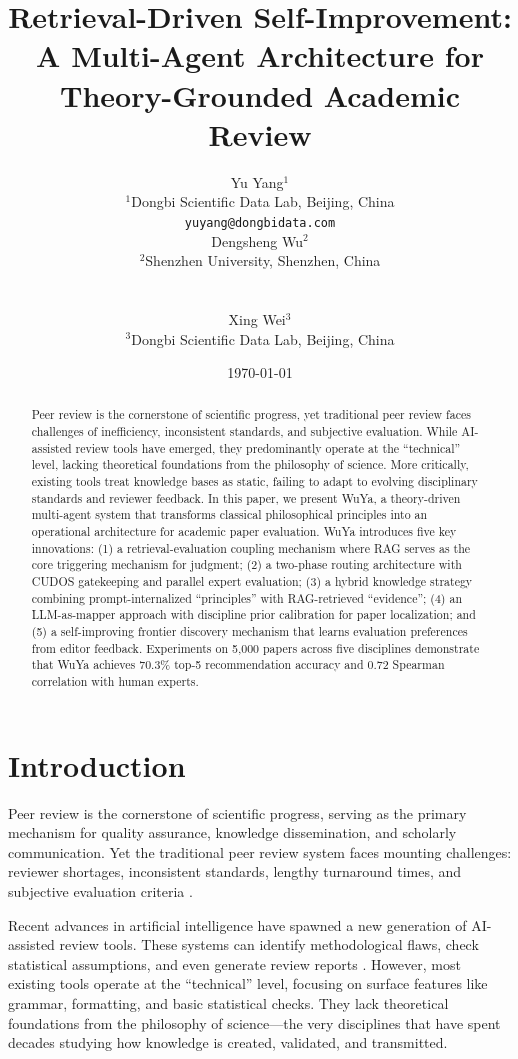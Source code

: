 \documentclass[11pt,a4paper]{article}
\title{Retrieval-Driven Self-Improvement: A Multi-Agent Architecture for Theory-Grounded Academic Review}
\author{
\begin{minipage}[t]{0.45\textwidth}
\centering
Yu Yang$^{1}$\\
\vspace{0.2em} 
\small $^{1}$Dongbi Scientific Data Lab, Beijing, China\\
\vspace{0.1em} 
\small \texttt{yuyang@dongbidata.com}
\end{minipage}
\hfill
\begin{minipage}[t]{0.45\textwidth}
\centering
Dengsheng Wu$^{2}$\\
\vspace{0.2em} 
\small $^{2}$Shenzhen University, Shenzhen, China
\end{minipage}
\\[1em]  
\begin{minipage}[t]{0.45\textwidth}
\centering
Xing Wei$^{3}$\\
\vspace{0.2em} 
\small $^{3}$Dongbi Scientific Data Lab, Beijing, China
\end{minipage}
}
\date{\today}
\newcommand{\rag}{RAG}
\begin{document}
\maketitle

\begin{abstract}
Peer review is the cornerstone of scientific progress, yet traditional peer review faces challenges of inefficiency, inconsistent standards, and subjective evaluation. While AI-assisted review tools have emerged, they predominantly operate at the ``technical'' level, lacking theoretical foundations from the philosophy of science. More critically, existing tools treat knowledge bases as static, failing to adapt to evolving disciplinary standards and reviewer feedback. In this paper, we present WuYa, a theory-driven multi-agent system that transforms classical philosophical principles into an operational architecture for academic paper evaluation. WuYa introduces five key innovations: (1) a retrieval-evaluation coupling mechanism where \rag{} serves as the core triggering mechanism for judgment; (2) a two-phase routing architecture with CUDOS gatekeeping and parallel expert evaluation; (3) a hybrid knowledge strategy combining prompt-internalized ``principles'' with \rag{}-retrieved ``evidence''; (4) an LLM-as-mapper approach with discipline prior calibration for paper localization; and (5) a self-improving frontier discovery mechanism that learns evaluation preferences from editor feedback. Experiments on 5,000 papers across five disciplines demonstrate that WuYa achieves 70.3\% top-5 recommendation accuracy and 0.72 Spearman correlation with human experts.
\end{abstract}

\section{Introduction}
\label{sec:introduction}

Peer review is the cornerstone of scientific progress, serving as the primary mechanism for quality assurance, knowledge dissemination, and scholarly communication. Yet the traditional peer review system faces mounting challenges: reviewer shortages, inconsistent standards, lengthy turnaround times, and subjective evaluation criteria \citep{smith2006peer}.

Recent advances in artificial intelligence have spawned a new generation of AI-assisted review tools. These systems can identify methodological flaws, check statistical assumptions, and even generate review reports \citep{liu2023review}. However, most existing tools operate at the ``technical'' level, focusing on surface features like grammar, formatting, and basic statistical checks. They lack theoretical foundations from the philosophy of science---the very disciplines that have spent decades studying how knowledge is created, validated, and transmitted.
\end{document}
